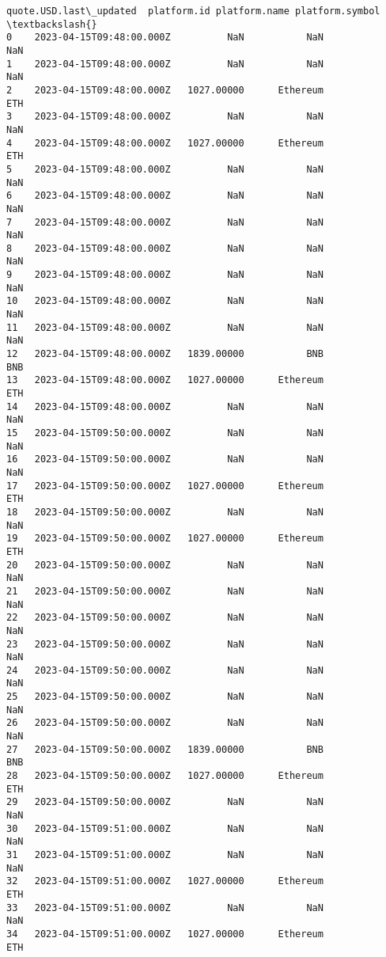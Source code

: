 \documentclass[11pt]{article}
\begin{document}
\begin{tcolorbox}[breakable, size=fbox, boxrule=.5pt, pad at break*=1mm, opacityfill=0]
\begin{Verbatim}[commandchars=\\\{\}]
       quote.USD.last\_updated  platform.id platform.name platform.symbol  \textbackslash{}
0    2023-04-15T09:48:00.000Z          NaN           NaN             NaN
1    2023-04-15T09:48:00.000Z          NaN           NaN             NaN
2    2023-04-15T09:48:00.000Z   1027.00000      Ethereum             ETH
3    2023-04-15T09:48:00.000Z          NaN           NaN             NaN
4    2023-04-15T09:48:00.000Z   1027.00000      Ethereum             ETH
5    2023-04-15T09:48:00.000Z          NaN           NaN             NaN
6    2023-04-15T09:48:00.000Z          NaN           NaN             NaN
7    2023-04-15T09:48:00.000Z          NaN           NaN             NaN
8    2023-04-15T09:48:00.000Z          NaN           NaN             NaN
9    2023-04-15T09:48:00.000Z          NaN           NaN             NaN
10   2023-04-15T09:48:00.000Z          NaN           NaN             NaN
11   2023-04-15T09:48:00.000Z          NaN           NaN             NaN
12   2023-04-15T09:48:00.000Z   1839.00000           BNB             BNB
13   2023-04-15T09:48:00.000Z   1027.00000      Ethereum             ETH
14   2023-04-15T09:48:00.000Z          NaN           NaN             NaN
15   2023-04-15T09:50:00.000Z          NaN           NaN             NaN
16   2023-04-15T09:50:00.000Z          NaN           NaN             NaN
17   2023-04-15T09:50:00.000Z   1027.00000      Ethereum             ETH
18   2023-04-15T09:50:00.000Z          NaN           NaN             NaN
19   2023-04-15T09:50:00.000Z   1027.00000      Ethereum             ETH
20   2023-04-15T09:50:00.000Z          NaN           NaN             NaN
21   2023-04-15T09:50:00.000Z          NaN           NaN             NaN
22   2023-04-15T09:50:00.000Z          NaN           NaN             NaN
23   2023-04-15T09:50:00.000Z          NaN           NaN             NaN
24   2023-04-15T09:50:00.000Z          NaN           NaN             NaN
25   2023-04-15T09:50:00.000Z          NaN           NaN             NaN
26   2023-04-15T09:50:00.000Z          NaN           NaN             NaN
27   2023-04-15T09:50:00.000Z   1839.00000           BNB             BNB
28   2023-04-15T09:50:00.000Z   1027.00000      Ethereum             ETH
29   2023-04-15T09:50:00.000Z          NaN           NaN             NaN
30   2023-04-15T09:51:00.000Z          NaN           NaN             NaN
31   2023-04-15T09:51:00.000Z          NaN           NaN             NaN
32   2023-04-15T09:51:00.000Z   1027.00000      Ethereum             ETH
33   2023-04-15T09:51:00.000Z          NaN           NaN             NaN
34   2023-04-15T09:51:00.000Z   1027.00000      Ethereum             ETH

\end{Verbatim}
\end{tcolorbox}
\end{document}
